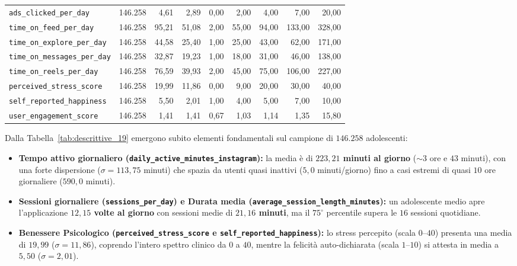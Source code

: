 \begin{table}[H]
{\begin{tabular}{lrrrrrrrr}
\texttt{ads\_clicked\_per\_day} & 146.258 & 4,61 & 2,89 & 0,00 & 2,00 & 4,00 & 7,00 & 20,00 \\
\texttt{time\_on\_feed\_per\_day} & 146.258 & 95,21 & 51,08 & 2,00 & 55,00 & 94,00 & 133,00 & 328,00 \\
\texttt{time\_on\_explore\_per\_day} & 146.258 & 44,58 & 25,40 & 1,00 & 25,00 & 43,00 & 62,00 & 171,00 \\
\texttt{time\_on\_messages\_per\_day} & 146.258 & 32,87 & 19,23 & 1,00 & 18,00 & 31,00 & 46,00 & 138,00 \\
\texttt{time\_on\_reels\_per\_day} & 146.258 & 76,59 & 39,93 & 2,00 & 45,00 & 75,00 & 106,00 & 227,00 \\
\texttt{perceived\_stress\_score} & 146.258 & 19,99 & 11,86 & 0,00 & 9,00 & 20,00 & 30,00 & 40,00 \\
\texttt{self\_reported\_happiness} & 146.258 & 5,50 & 2,01 & 1,00 & 4,00 & 5,00 & 7,00 & 10,00 \\
\texttt{user\_engagement\_score} & 146.258 & 1,41 & 1,41 & 0,67 & 1,03 & 1,14 & 1,35 & 15,80 \\
\bottomrule
\end{tabular}%
}
\end{table}

Dalla Tabella~\ref{tab:descrittive_19} emergono subito elementi fondamentali sul campione di $146.258$ adolescenti:
\begin{itemize}
    \item \textbf{Tempo attivo giornaliero (\texttt{daily\_active\_minutes\_instagram}):} la media è di \textbf{$223,21$ minuti al giorno} ($\sim 3\text{ ore e }43\text{ minuti}$), con una forte dispersione ($\sigma = 113,75$ minuti) che spazia da utenti quasi inattivi ($5,0$ minuti/giorno) fino a casi estremi di quasi $10$ ore giornaliere ($590,0$ minuti).
    \item \textbf{Sessioni giornaliere (\texttt{sessions\_per\_day}) e Durata media (\texttt{average\_session\_length\_minutes}):} un adolescente medio apre l'applicazione \textbf{$12,15$ volte al giorno} con sessioni medie di \textbf{$21,16$ minuti}, ma il $75^\circ$ percentile supera le $16$ sessioni quotidiane.
    \item \textbf{Benessere Psicologico (\texttt{perceived\_stress\_score} e \texttt{self\_reported\_happiness}):} lo stress percepito (scala $0\text{--}40$) presenta una media di \textbf{$19,99$} ($\sigma = 11,86$), coprendo l'intero spettro clinico da $0$ a $40$, mentre la felicità auto-dichiarata (scala $1\text{--}10$) si attesta in media a \textbf{$5,50$} ($\sigma = 2,01$).
\end{itemize}

